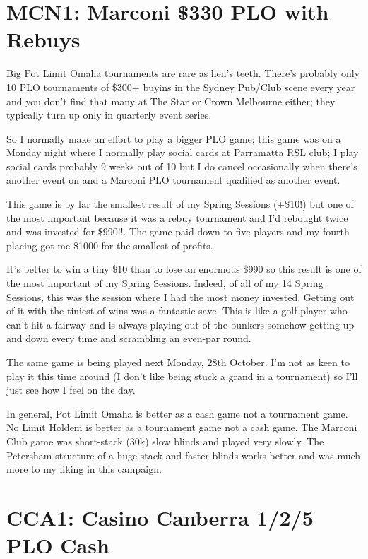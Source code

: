 \section*{MCN1: Marconi \$330 PLO with Rebuys}

Big Pot Limit Omaha tournaments are rare as hen's teeth. There's
probably only 10 PLO tournaments of \$300+ buyins in the Sydney
Pub/Club scene every year and you don't find that many at The Star or
Crown Melbourne either; they typically turn up only in quarterly event
series.

So I normally make an effort to play a bigger PLO game; this game was
on a Monday night where I normally play social cards at Parramatta RSL
club; I play social cards probably 9 weeks out of 10 but I do cancel
occasionally when there's another event on and a Marconi PLO
tournament qualified as another event.

This game is by far the smallest result of my Spring Sessions (+\$10!)
but one of the most important because it was a rebuy tournament and
I'd rebought twice and was invested for \$990!!. The game paid down to
five players and my fourth placing got me \$1000 for the smallest of
profits.

It's better to win a tiny \$10 than to lose an enormous \$990 so this
result is one of the most important of my Spring Sessions. Indeed,
of all of my 14 Spring Sessions, this was the session where I had the
most money invested. Getting out of it with the tiniest of wins was a
fantastic save. This is like a golf player who can't hit a fairway and
is always playing out of the bunkers somehow getting up and down every
time and scrambling an even-par round.

The same game is being played next Monday, 28th October. I'm not as
keen to play it this time around (I don't like being stuck a grand in
a tournament) so I'll just see how I feel on the day.

In general, Pot Limit Omaha is better as a cash game not a tournament
game. No Limit Holdem is better as a tournament game not a cash game.
The Marconi Club game was short-stack (30k) slow blinds and played
very slowly. The Petersham structure of a huge stack and faster blinds
works better and was much more to my liking in this campaign.

\section*{CCA1: Casino Canberra 1/2/5 PLO Cash}


